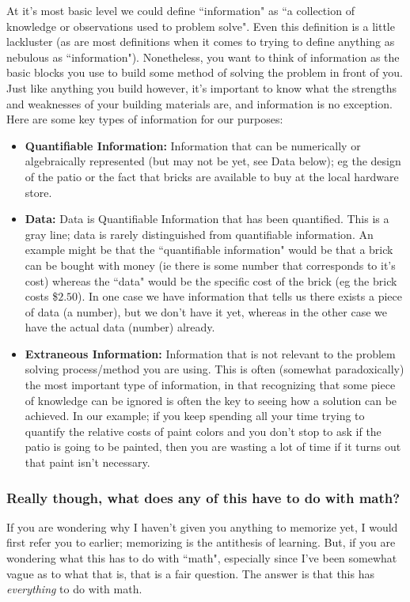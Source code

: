 At it's most basic level we could define ``information" as ``a collection of knowledge or observations used to problem solve". Even this definition is a little lackluster (as are most definitions when it comes to trying to define anything as nebulous as ``information"). Nonetheless, you want to think of information as the basic blocks you use to build some method of solving the problem in front of you. Just like anything you build however, it's important to know what the strengths and weaknesses of your building materials are, and information is no exception. Here are some key types of information for our purposes:
\begin{itemize}
\item{\textbf{Quantifiable Information:}} Information that can be numerically or algebraically represented (but may not be yet, see Data below); eg the design of the patio or the fact that bricks are available to buy at the local hardware store.
\item{\textbf{Data:}} Data is Quantifiable Information that has been quantified. This is a gray line; data is rarely distinguished from quantifiable information. An example might be that the ``quantifiable information" would be that a brick can be bought with money (ie there is some number that corresponds to it's cost) whereas the ``data" would be the specific cost of the brick (eg the brick costs \$$2.50$). In one case we have information that tells us there exists a piece of data (a number), but we don't have it yet, whereas in the other case we have the actual data (number) already.
\item{\textbf{Extraneous Information:}} Information that is not relevant to the problem solving process/method you are using. This is often (somewhat paradoxically) the most important type of information, in that recognizing that some piece of knowledge can be ignored is often the key to seeing how a solution can be achieved. In our example; if you keep spending all your time trying to quantify the relative costs of paint colors and you don't stop to ask if the patio is going to be painted, then you are wasting a lot of time if it turns out that paint isn't necessary.
\end{itemize}

\subsubsection*{Really though, what does any of this have to do with math?}
If you are wondering why I haven't given you anything to memorize yet, I would first refer you to earlier; memorizing is the antithesis of learning. But, if you are wondering what this has to do with ``math", especially since I've been somewhat vague as to what that is, that is a fair question. The answer is that this has \textit{everything} to do with math.

